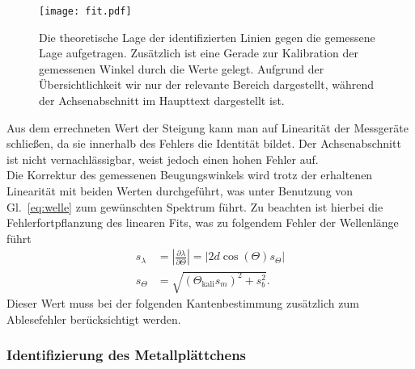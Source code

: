 \begin{figure}[h!]
    \centering
    \texttt{[image: fit.pdf]}
    \caption{\label{fig:fitkali}Die theoretische Lage der identifizierten Linien gegen 
    die gemessene Lage aufgetragen. Zusätzlich ist eine Gerade zur Kalibration der gemessenen 
    Winkel durch die Werte gelegt. Aufgrund der Übersichtlichkeit wir nur der relevante 
    Bereich dargestellt, während der Achsenabschnitt im Haupttext dargestellt ist.}
\end{figure}\FloatBarrier
Aus dem errechneten Wert der Steigung kann man auf Linearität der Messgeräte schließen, da sie innerhalb 
des Fehlers die Identität bildet. Der Achsenabschnitt ist nicht vernachlässigbar, weist jedoch einen
hohen Fehler auf. \\
Die Korrektur des gemessenen Beugungswinkels wird trotz der erhaltenen Linearität 
mit beiden Werten durchgeführt, was unter 
Benutzung von Gl.~\eqref{eq:welle} zum gewünschten Spektrum führt. 
Zu beachten ist hierbei die Fehlerfortpflanzung des linearen Fits, was zu folgendem 
Fehler der Wellenlänge führt
\begin{align}
    s_{\lambda} &= \left\vert\frac{\partial \lambda}{\partial \Theta}\right\vert = \left\vert2d\cos(\Theta)s_{\Theta}\right\vert \\
    s_{\Theta} &= \sqrt{\left(\Theta_{\text{kali}}s_{m}\right)^{2} + s_{b}^{2}}.
\end{align}
Dieser Wert muss bei der folgenden Kantenbestimmung zusätzlich zum Ablesefehler berücksichtigt werden.
\subsubsection{Identifizierung des Metallplättchens}





